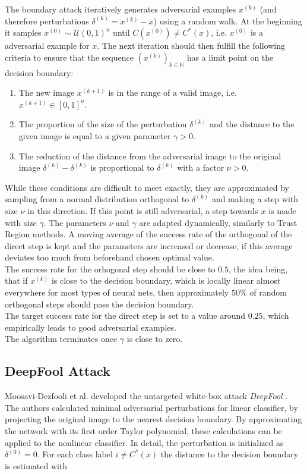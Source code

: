 The boundary attack iteratively generates adversarial examples $x^{(k)}$ (and therefore perturbations $\delta^{(k)} = x^{(k)} - x$) using a random walk. At the beginning it samples $x^{(0)} \sim \mathcal{U}(0,1)^n$ until $C(x^{(0)}) \neq C^*(x)$, i.e. $x^{(0)}$ is a adversarial example for $x$.
The next iteration should then fulfill the following criteria to ensure that the sequence $(x^{(k)})_{k \in \mathbb{N}}$ has a limit point on the decision boundary:

\begin{enumerate}
	\item The new image $x^{(k+1)}$ is in the range of a valid image,
	i.e. $x^{(k+1)}\in [0,1]^n$.
	\item The proportion of the size of the perturbation $\delta^{(k)}$
	and the distance to the given image is equal to a given parameter
	$\gamma > 0$.
	\item The reduction of the distance from the adversarial image to the
	original image $\delta^{(k)} - \delta^{(k)}$ is proportional to
	$\delta^{(k)}$ with a factor $\nu>0$.
\end{enumerate}

While these conditions are difficult to meet exactly, they are approximated by sampling from a normal distribution orthogonal to $\delta^{(k)}$ and making a step with size $\nu$ in this direction. If this point is still adversarial, a step towards $x$ is made with size $\gamma$. The parameters $\nu$ and $\gamma$ are adapted dynamically, similarly to Trust Region methods.
A moving average of the success rate of the orthogonal of the direct step is kept and the parameters are increased or decrease, if this average deviates too much from beforehand chosen optimal value. \\
The success rate for the orhogonal step should be close to $0.5$, the idea being, that if $x^{(k)}$ is close to the decision boundary, which is locally linear almost everywhere for most types of neural nets, then approximately $50\%$ of random orthogonal steps should pass the decision boundary. \\
The target success rate for the direct step is set to a value around $0.25$, which empirically leads to good adversarial examples. \\
The algorithm terminates once $\gamma$ is close to zero.

\subsection{DeepFool Attack}
Moosavi-Dezfooli et al. developed the untargeted white-box attack \emph{DeepFool} \cite{deepfool}.
The authors calculated minimal adversarial perturbations for linear classifier, by projecting the original image to the nearest decision boundary. By approximating the network with its first order Taylor polynomial, these calculations can be applied to the nonlinear classifier.
In detail, the perturbation is initialized as $\delta^{(0)} = 0$. For each class label $i \neq C^*(x)$ the distance to the decision boundary is estimated with

